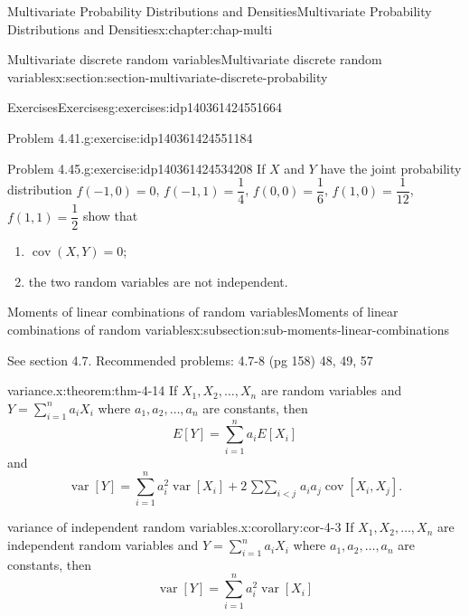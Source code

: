 \documentclass[oneside,10pt,]{book}
\numberwithin{equation}{section}
\newcommand{\lt}{<}
\begin{document}
\begin{chapterptx}{Multivariate Probability Distributions and Densities}{}{Multivariate Probability Distributions and Densities}{}{}{x:chapter:chap-multi}
\begin{sectionptx}{Multivariate discrete random variables}{}{Multivariate discrete random variables}{}{}{x:section:section-multivariate-discrete-probability}
\begin{exercises-subsection}{Exercises}{}{Exercises}{}{}{g:exercises:idp140361424551664}
\begin{divisionexercise}{1}{Problem 4.41.}{}{g:exercise:idp140361424551184}
\end{divisionexercise}%
\begin{divisionexercise}{2}{Problem 4.45.}{}{g:exercise:idp140361424534208}%
If \(X\) and \(Y\) have the joint probability distribution \(f(-1, 0) = 0\),  \(f(-1, 1) = \dfrac{1}{4}\), \(f(0, 0) = \dfrac{1}{6}\), \(f(1, 0) = \dfrac{1}{12}\), \(f(1,
1) = \dfrac{1}{2}\) show that%
\begin{enumerate}[label=(\alph*)]
\item{}\(\operatorname{cov}(X, Y) = 0\);%
\item{}the two random variables are not independent.%
\end{enumerate}
%
\end{divisionexercise}%
\end{exercises-subsection}
%
%
\typeout{************************************************}
\typeout{************************************************}
%
\begin{subsectionptx}{Moments of linear combinations of random variables}{}{Moments of linear combinations of random variables}{}{}{x:subsection:sub-moments-linear-combinations}
\begin{introduction}{}%
See section 4.7. Recommended problems: 4.7-8 (pg 158) 48, 49, 57%
\end{introduction}%
\begin{theorem}{variance.}{}{x:theorem:thm-4-14}%
If \(\displaystyle X_1, X_2, \dots, X_n\) are random variables and \(\displaystyle Y = \sum_{i=1}^n a_iX_i\) where \(\displaystyle
a_1, a_2, \dots, a_n\) are constants, then%
\begin{equation*}
E[Y] = \sum_{i=1}^n
a_iE[X_i]
\end{equation*}
and%
\begin{equation*}
\operatorname{var}[Y] = \sum_{i=1}^n a_i^2
\operatorname{var}[X_i] + 2 \mathop{\sum \sum}_{i \lt j} a_i
a_j\operatorname{cov}[X_i,X_j]\text{.}
\end{equation*}
%
\end{theorem}
\begin{corollary}{variance of independent random variables.}{}{x:corollary:cor-4-3}%
If \(\displaystyle X_1, X_2, \dots, X_n\) are independent random variables and \(\displaystyle Y = \sum_{i=1}^n a_iX_i\) where \(\displaystyle a_1, a_2, \dots, a_n\) are constants, then%
\begin{equation*}
\operatorname{var}[Y] = \sum_{i=1}^n
a_i^2\operatorname{var}[X_i]
\end{equation*}

\end{corollary}
\end{subsectionptx}
\end{sectionptx}
\end{chapterptx}
\end{document}
